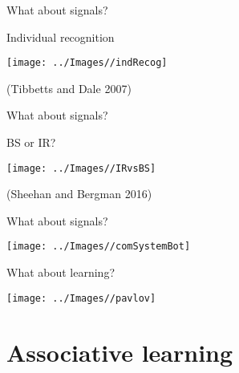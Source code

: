 \documentclass[
  ignorenonframetext,
]{beamer}
\begin{document}
\begin{frame}{What about signals?}
\protect\hypertarget{what-about-signals-2}{}

\begin{block}{Individual recognition}

\begin{center}\texttt{[image: ../Images//indRecog]} \end{center}

(Tibbetts and Dale 2007)

\end{block}

\end{frame}

\begin{frame}{What about signals?}
\protect\hypertarget{what-about-signals-3}{}

\begin{block}{BS or IR?}

\begin{center}\texttt{[image: ../Images//IRvsBS]} \end{center}

(Sheehan and Bergman 2016)

\end{block}

\end{frame}

\begin{frame}{What about signals?}
\protect\hypertarget{what-about-signals-4}{}

\begin{center}\texttt{[image: ../Images//comSystemBot]} \end{center}

\end{frame}

\begin{frame}{What about learning?}
\protect\hypertarget{what-about-learning}{}

\begin{center}\texttt{[image: ../Images//pavlov]} \end{center}

\end{frame}

\hypertarget{associative-learning}{%
\section{Associative learning}\label{associative-learning}}
\end{document}
